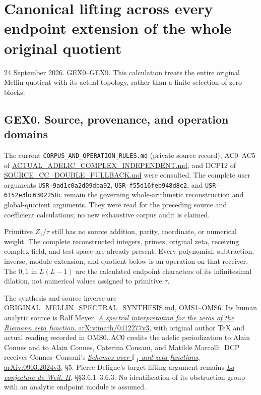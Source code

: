 \section{Canonical lifting across every endpoint extension of the whole
original
quotient}\label{canonical-lifting-across-every-endpoint-extension-of-the-whole-original-quotient}

24 September 2026. GEX0--GEX9. This calculation treats the entire
original Mellin quotient with its actual topology, rather than a finite
selection of zero blocks.

\subsection{GEX0. Source, provenance, and operation
domains}\label{gex0.-source-provenance-and-operation-domains}

The current \nolinkurl{CORPUS_AND_OPERATION_RULES.md} (private source record), AC0--AC5 of
\url{ACTUAL_ADELIC_COMPLEX_INDEPENDENT.md}, and DCP12 of
\url{SOURCE_CC_DOUBLE_PULLBACK.md} were consulted. The complete user
arguments \nolinkurl{USR-9ad1c0a2d09dba92}, \nolinkurl{USR-f55d16feb948d8c2}, and
\nolinkurl{USR-6152e3bc6302258c} remain the governing whole-arithmetic
reconstruction and global-quotient arguments. They were read for the
preceding source and coefficient calculations; no new exhaustive corpus
audit is claimed.

Primitive \(Z_1/\tau\) still has no source addition, parity, coordinate,
or numerical weight. The complete reconstructed integers, primes,
original zeta, receiving complex field, and test space are already
present. Every polynomial, subtraction, inverse, module extension, and
quotient below is an operation on that receiver. The \(0,1\) in
\(L(L-1)\) are the calculated endpoint characters of its infinitesimal
dilation, not numerical values assigned to primitive \(\tau\).

The synthesis and source inverse are
\url{ORIGINAL_MELLIN_SPECTRAL_SYNTHESIS.md}, OMS1--OMS6. Its human
analytic source is Ralf Meyer,
\href{https://arxiv.org/abs/math/0412277v3}{\emph{A spectral
interpretation for the zeros of the Riemann zeta function},
arXiv:math/0412277v3}, with original author TeX and actual reading
recorded in OMS0. AC0 credits the adelic periodization to Alain Connes
and to Alain Connes, Caterina Consani, and Matilde Marcolli. DCP
receives Connes--Consani's
\href{https://arxiv.org/abs/0903.2024v3}{\emph{Schemes over
\(\mathbb F_1\) and zeta functions}, arXiv:0903.2024v3}, §5. Pierre
Deligne's target lifting argument remains
\href{https://www.numdam.org/item/PMIHES_1980__52__137_0/}{\emph{La
conjecture de Weil. II}}, §§3.6.1--3.6.3. No identification of its
obstruction group with an analytic endpoint module is assumed.


